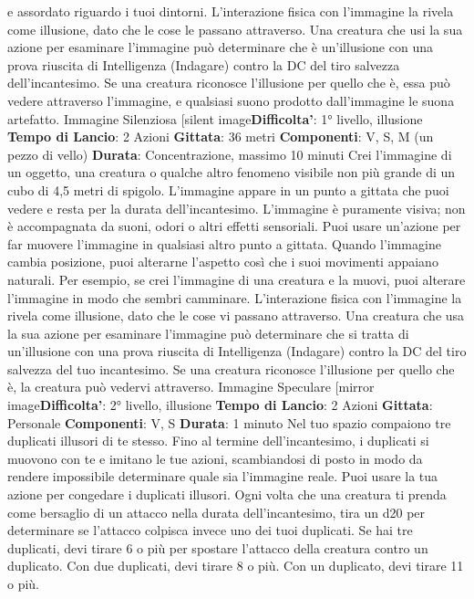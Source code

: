 \begin{multicols}{2}
e assordato riguardo i tuoi dintorni.
L’interazione fisica con l’immagine la rivela come
illusione, dato che le cose le passano attraverso. Una
creatura che usi la sua azione per esaminare
l’immagine può determinare che è un’illusione con una
prova riuscita di Intelligenza (Indagare) contro la DC del
tiro salvezza dell’incantesimo. Se una creatura
riconosce l’illusione per quello che è, essa può vedere
attraverso l’immagine, e qualsiasi suono prodotto
dall’immagine le suona artefatto.
Immagine Silenziosa
[silent image\textbf{Difficolta'}:
1° livello, illusione
\textbf{Tempo di Lancio}: 2 Azioni
\textbf{Gittata}: 36 metri
\textbf{Componenti}: V, S, M (un pezzo di vello)
\textbf{Durata}: Concentrazione, massimo 10 minuti
Crei l’immagine di un oggetto, una creatura o qualche
altro fenomeno visibile non più grande di un cubo di 4,5
metri di spigolo. L’immagine appare in un punto a
gittata che puoi vedere e resta per la durata
dell’incantesimo. L’immagine è puramente visiva; non è
accompagnata da suoni, odori o altri effetti sensoriali.
Puoi usare un’azione per far muovere l’immagine in
qualsiasi altro punto a gittata. Quando l’immagine
cambia posizione, puoi alterarne l’aspetto così che i
suoi movimenti appaiano naturali. Per esempio, se crei
l’immagine di una creatura e la muovi, puoi alterare
l’immagine in modo che sembri camminare.
L’interazione fisica con l’immagine la rivela come
illusione, dato che le cose vi passano attraverso. Una
creatura che usa la sua azione per esaminare
l’immagine può determinare che si tratta di un’illusione
con una prova riuscita di Intelligenza (Indagare) contro
la DC del tiro salvezza del tuo incantesimo. Se una
creatura riconosce l’illusione per quello che è, la
creatura può vedervi attraverso.
Immagine Speculare
[mirror image\textbf{Difficolta'}:
2° livello, illusione
\textbf{Tempo di Lancio}: 2 Azioni
\textbf{Gittata}: Personale
\textbf{Componenti}: V, S
\textbf{Durata}: 1 minuto
Nel tuo spazio compaiono tre duplicati illusori di te
stesso. Fino al termine dell’incantesimo, i duplicati si
muovono con te e imitano le tue azioni, scambiandosi di
posto in modo da rendere impossibile determinare
quale sia l’immagine reale. Puoi usare la tua azione per
congedare i duplicati illusori.
Ogni volta che una creatura ti prenda come bersaglio di
un attacco nella durata dell’incantesimo, tira un d20 per
determinare se l’attacco colpisca invece uno dei tuoi
duplicati.
Se hai tre duplicati, devi tirare 6 o più per spostare
l’attacco della creatura contro un duplicato. Con due
duplicati, devi tirare 8 o più. Con un duplicato, devi
tirare 11 o più.

\end{multicols}

